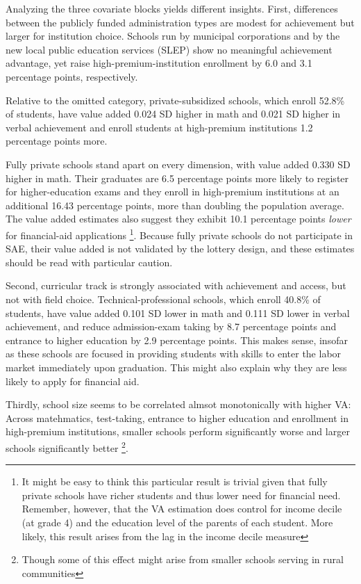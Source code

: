 \documentclass[a4paper, article, english, oneside, unknownkeysallowed, 12pt]{memoir}
\begin{document}


Analyzing the three covariate blocks yields different insights. 
First, differences between the publicly funded administration types are modest for achievement but larger for institution choice. 
Schools run by municipal corporations and by the new local public education services (SLEP) show no meaningful achievement advantage, yet raise high-premium-institution enrollment by 6.0 and 3.1 percentage points, respectively. 

Relative to the omitted category, private-subsidized schools, which enroll 52.8\% of students, have value added 0.024 SD higher in math and 0.021 SD higher in verbal achievement and enroll students at high-premium institutions 1.2 percentage points more.

Fully private schools stand apart on every dimension, with value added 0.330 SD higher in math.
Their graduates are 6.5 percentage points more likely to register for higher-education exams and they enroll in high-premium institutions at an additional 16.43 percentage points, more than doubling the population average.
The value added estimates also suggest they exhibit 10.1 percentage points \emph{lower} for financial-aid applications 
\footnote{It might be easy to think this particular result is trivial given that fully private schools have richer students and thus lower need for financial need. 
Remember, however, that the VA estimation does control for income decile (at grade 4) and the education level of the parents of each student.
More likely, this result arises from the lag in the income decile measure}. 
Because fully private schools do not participate in SAE, their value added is not validated by the lottery design, and these estimates should be read with particular caution.

Second, curricular track is strongly associated with achievement and access, but not with field choice. 
Technical-professional schools, which enroll 40.8\% of students, have value added 0.101 SD lower in math and 0.111 SD lower in verbal achievement, 
and reduce admission-exam taking by 8.7 percentage points and entrance to higher education by 2.9 percentage points.
This makes sense, insofar as these schools are focused in providing students with skills to enter the labor market immediately upon graduation.
This might also explain why they are less likely to apply for financial aid. 

Thirdly, school size seems to be correlated almsot monotonically with higher VA: 
Across matehmatics, test-taking, entrance to higher education and enrollment in high-premium institutions, smaller schools perform significantly worse and larger schools significantly better \footnote{Though some of this effect might arise from smaller schools serving in rural communities}.
\end{document}
